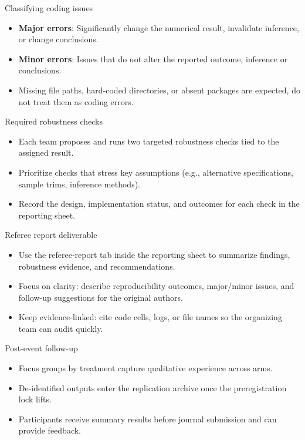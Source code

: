 \documentclass[aspectratio=169,professionalfonts]{beamer}
\begin{document}
\begin{frame}{Classifying coding issues}
  \begin{itemize}
    \item \textbf{Major errors}: Significantly change the numerical result, invalidate inference, or change conclusions.
    \item \textbf{Minor errors}: Issues that do not alter the reported outcome, inference or conclusions.
    \item Missing file paths, hard-coded directories, or absent packages are expected, do not treat them as coding errors.
  \end{itemize}
\end{frame}

\begin{frame}{Required robustness checks}
  \begin{itemize}
    \item Each team proposes and runs two targeted robustness checks tied to the assigned result.
    \item Prioritize checks that stress key assumptions (e.g., alternative specifications, sample trims, inference methods).
    \item Record the design, implementation status, and outcomes for each check in the reporting sheet.
  \end{itemize}
\end{frame}

\begin{frame}{Referee report deliverable}
  \begin{itemize}
    \item Use the referee-report tab inside the reporting sheet to summarize findings, robustness evidence, and recommendations.
    \item Focus on clarity: describe reproducibility outcomes, major/minor issues, and follow-up suggestions for the original authors.
    \item Keep evidence-linked: cite code cells, logs, or file names so the organizing team can audit quickly.
  \end{itemize}
\end{frame}

\begin{frame}{Post-event follow-up}
  \begin{itemize}
    \item Focus groups by treatment capture qualitative experience across arms.
    \item De-identified outputs enter the replication archive once the preregistration lock lifts.
    \item Participants receive summary results before journal submission and can provide feedback.
  \end{itemize}
\end{frame}
\end{document}
